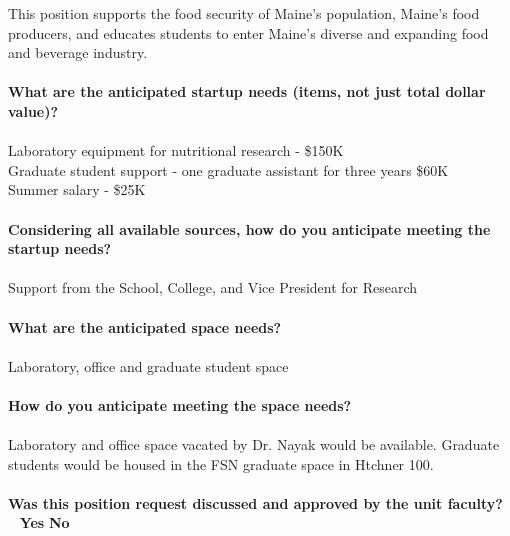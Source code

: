 \documentclass[11pt]{article}
\begin{document}
This position supports the food security of Maine's population, Maine's food producers, and educates students to enter Maine's diverse and expanding food and beverage industry.
\\~\\
\vfill
\newpage\noindent\textbf{\rmfamily What are the anticipated startup needs (items, not just total dollar value)?}\\~\\
Laboratory equipment for nutritional research - \$150K \\
Graduate student support - one graduate assistant for three years \$60K\\
Summer salary - \$25K\\~\\
\vfill
\noindent\textbf{\rmfamily Considering all available sources, how do you anticipate meeting the startup needs?}\\~\\
Support from the School, College, and Vice President for Research\\~\\
\vfill
\noindent\textbf{\rmfamily What are the anticipated space needs?}\\~\\ Laboratory, office and graduate student space\\~\\
\vfill
\noindent\textbf{\rmfamily How do you anticipate meeting the space needs?} \\~\\
Laboratory and office space vacated by Dr. Nayak would be available. Graduate students would be housed in the FSN graduate space in Htchner 100.\\~\\
\vfill
\noindent\textbf{\rmfamily Was this position request discussed and approved by the unit faculty?} \hfill ~ \hfill \textbf{\Large{\HollowBox} \normalsize{Yes}} \hfill \textbf{\Large{\HollowBox} \normalsize{ No}}\\~\\%
\end{document}
